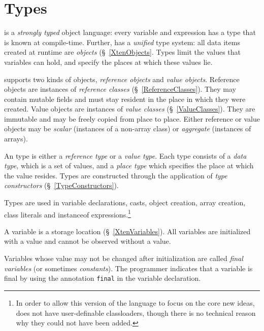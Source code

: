 \chapter{Types}
\label{XtenTypes}

{}\Xten{} is a {\em strongly typed} object language: every variable
and expression has a type that is known at compile-time. Further,
\Xten{} has a {\em unified} type system: all data items created at
runtime are {\em objects} (\S~\ref{XtenObjects}. Types limit the
values that variables can hold, and specify the places at which these
values lie.

{}\Xten{} supports two kinds of objects, {\em reference objects} and
{\em value objects}.  Reference objects are instances of {\em
reference classes} (\S~\ref{ReferenceClasses}). They may contain
mutable fields and must stay resident in the place in which they were
created. Value objects are instances of {\em value classes}
(\S~\ref{ValueClasses}). They are immutable and may be freely copied
from place to place. Either reference or value objects may be 
{\em scalar} (instances of a non-array class) or {\em aggregate} (instances
of arrays).

An \Xten{} type is either a {\em reference type} or a {\em value
type}.  Each type consists of a {\em data type}, which is a set of
values, and a {\em place type} which specifies the place at which the
value resides.  Types are constructed through the application of {\em
type constructors} (\S~\ref{TypeConstructors}).

Types are used in variable declarations, casts, object creation, array
creation, class literals and {\cf instanceof} expressions.\footnote{In
order to allow this version of the language to focus on the core new
ideas, \XtenCurrVer{} does not have user-definable classloaders,
though there is no technical reason why they could not have been
added.}

A variable is a storage location (\S~\ref{XtenVariables}). All
variables are initialized with a value and cannot be observed without
a value. 

Variables whose value may not be changed after initialization are
called {\em final variables} (or sometimes {\em constants}).  The
programmer indicates that a variable is final by using the annotation
{\tt final} in the variable declaration.  


